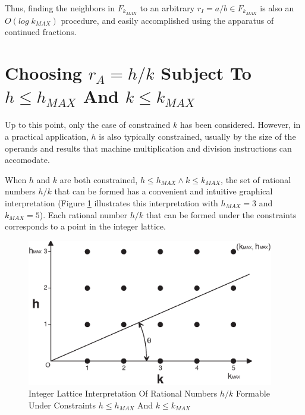 \documentclass{esub2acm}
\begin{document}
Thus, finding the neighbors in $F_{k_{MAX}}$ to an arbitrary
$r_I = a/b \in F_{k_{MAX}}$ is also an $O(log \; k_{MAX})$
procedure, and easily accomplished using the apparatus of continued
fractions.


\section{Choosing $r_A = h/k$ Subject To $h \leq h_{MAX}$ And $k \leq k_{MAX}$}
\label{sec:hmaxandkmaxcase}

Up to this point, only the case of constrained $k$
has been considered.  However, in a practical application, $h$ is also typically
constrained, usually by the size of the operands
and results that machine multiplication
and division instructions can accomodate.

When $h$ and $k$ are both constrained, $h \leq h_{MAX} \wedge k \leq k_{MAX}$,
the set of rational numbers $h/k$ that can be formed has a convenient
and intuitive
graphical interpretation (Figure \ref{fig:lattice01}
illustrates this interpretation
with $h_{MAX}=3$ and $k_{MAX}=5$).
Each rational number $h/k$ that can be formed under the constraints
corresponds to a point in the integer lattice.

\begin{figure}
\centering
\includegraphics[width=4.25in]{intlat01.eps}
\caption{Integer Lattice Interpretation Of Rational Numbers $h/k$ Formable Under Constraints
        $h \leq h_{MAX}$ And $k \leq k_{MAX}$}
\label{fig:lattice01}
\end{figure}
\end{document}
